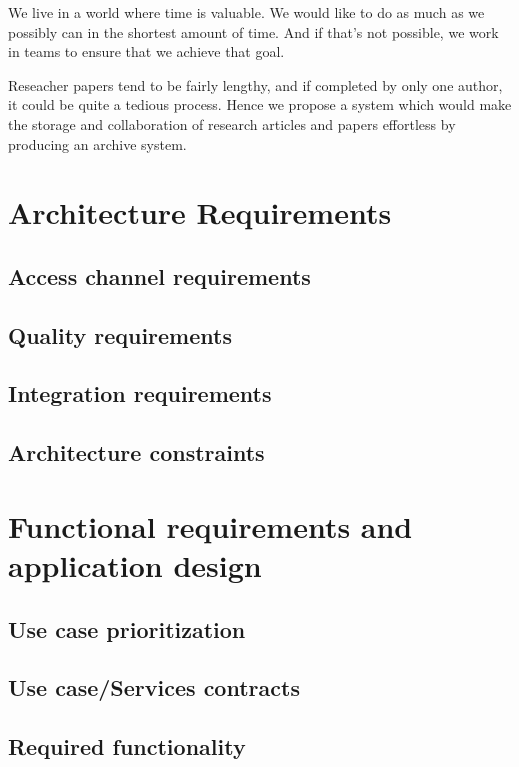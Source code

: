 \documentclass[a4paper,12pt]{report}
\begin{document}
We live in a world where time is valuable. We would like to do as much as we possibly can in the shortest amount of time. And if that's not possible, we work in teams to ensure that we achieve that goal. 

Reseacher papers tend to be fairly lengthy, and if completed by only one author, it could be quite a tedious process. Hence we propose a system which would make the storage and collaboration of research articles and papers effortless by producing an archive system.

\section{Architecture Requirements}

\subsection{Access channel requirements}

\subsection{Quality requirements}

\subsection{Integration requirements}

\subsection{Architecture constraints}


\section{Functional requirements and application design}

\subsection{Use case prioritization}

\subsection{Use case/Services contracts}

\subsection{Required functionality}
\end{document}
